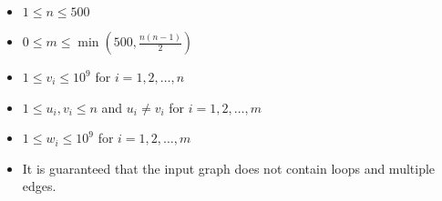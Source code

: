 \begin{itemize}
\tightlist
\item $1 \leq n \leq 500$
\item $0 \leq m \leq \min(500, \frac{n(n - 1)}{2})$
\item $1 \leq v_i \leq 10 ^ 9$ for $i = 1, 2, \ldots, n$
\item $1 \leq u_i, v_i \leq n$ and $u_i \neq v_i$ for $i = 1, 2, \ldots, m$
\item $1 \leq w_i \leq 10^ 9$ for $i = 1, 2, \ldots, m$
\item It is guaranteed that the input graph does not contain loops and multiple edges.
\end{itemize}
